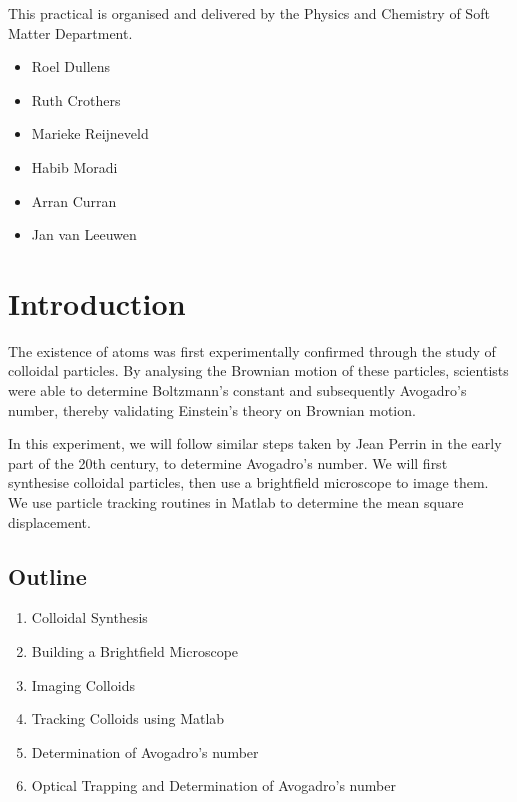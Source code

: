 \documentclass[12pt,a4paper,twoside]{article}
\begin{document}
This practical is organised and delivered by the Physics and Chemistry of Soft Matter Department. 

\begin{itemize}
    \item Roel Dullens 
    \item Ruth Crothers
    \item Marieke Reijneveld
    \item Habib Moradi
    \item Arran Curran
    \item Jan van Leeuwen
\end{itemize}




\newpage

\section{Introduction}

The existence of atoms was first experimentally confirmed through the study of colloidal particles. By analysing the Brownian motion of these particles, scientists were able to determine Boltzmann’s constant and subsequently Avogadro’s number, thereby validating Einstein’s theory on Brownian motion.

In this experiment, we will follow similar steps taken by Jean Perrin in the early part of the 20th century, to determine Avogadro’s number. We will first synthesise colloidal particles, then use a brightfield microscope to image them. We use particle tracking routines in Matlab to determine the mean square displacement.

\subsection{Outline}

\begin{enumerate}
    \item Colloidal Synthesis
    \item Building a Brightfield Microscope
    \item Imaging Colloids
    \item Tracking Colloids using Matlab
    \item Determination of Avogadro’s number
    \item Optical Trapping and Determination of Avogadro’s number
\end{enumerate}
\end{document}
